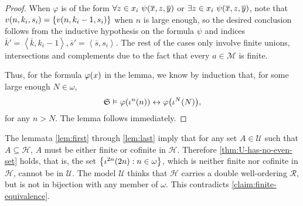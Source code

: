 \documentclass[11pt]{article}
\theoremstyle{plain}
\theoremstyle{definition}
\newcommand{\tuple}[1]{\left\langle #1 \right\rangle}
\begin{document}
\begin{proof}
  When $\varphi$ is of the form $\forall z \in x_i \ \psi\mleft(\overline{x}, z, \overline{y}\mright)$ or $\exists z \in x_i \ \psi\mleft(\overline{x}, z, \overline{y}\mright)$, note that $v\mleft(n, k_i, s_i\mright) = \left\{v\mleft(n, k_i - 1, s_i\mright)\right\}$ when $n$ is large enough, so the desired conclusion follows from the inductive hypothesis on the formula $\psi$ and indices $\overline{k}' = \tuple{\overline{k}, k_i - 1}, \overline{s}' = \tuple{\overline{s}, s_i}$. The rest of the cases only involve finite unions, intersections and complements due to the fact that every $a \in \mathcal{M}$ is finite.

  Thus, for the formula $\varphi\mleft(x\mright)$ in the lemma, we know by induction that, for some large enough $N \in \omega$,
  \[\mathfrak{S} \vDash \varphi\mleft(\iota^n\mleft(n\mright)\mright) \leftrightarrow \varphi\mleft(\iota^N\mleft(N\mright)\mright),\]
  for any $n > N$. The lemma follows immediately.
\end{proof}

The lemmata \ref{lem:first} through \ref{lem:last} imply that for any set $A \in \mathcal{U}$ such that $A \subseteq \mathcal{H}$, $A$ must be either finite or cofinite in $\mathcal{H}$. Therefore \autoref{thm:U-has-no-even-set} holds, that is, the set $\left\{\iota^{2n}\mleft(2n\mright) : n \in \omega\right\}$, which is neither finite nor cofinite in $\mathcal{H}$, cannot be in $\mathcal{U}$. The model $\mathcal{U}$ thinks that $\mathcal{H}$ carries a double well-ordering $\mathcal{R}$, but is not in bijection with any member of $\omega$. This contradicts \autoref{claim:finite-equivalence}.

\bibmain
\end{document}
